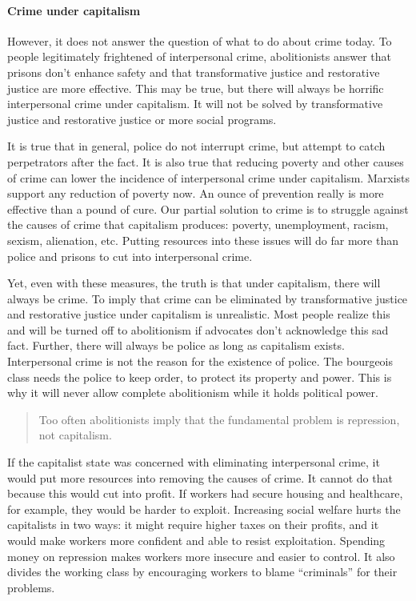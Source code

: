 \paragraph{Crime under capitalism}

However, it does not answer the question of what to do about crime today. To people legitimately frightened of interpersonal crime, abolitionists answer that prisons don't enhance safety and that transformative justice and restorative justice are more effective. This may be true, but there will always be horrific interpersonal crime under capitalism. It will not be solved by transformative justice and restorative justice or more social programs.

It is true that in general, police do not interrupt crime, but attempt to catch perpetrators after the fact. It is also true that reducing poverty and other causes of crime can lower the incidence of interpersonal crime under capitalism. Marxists support any reduction of poverty now. An ounce of prevention really is more effective than a pound of cure. Our partial solution to crime is to struggle against the causes of crime that capitalism produces: poverty, unemployment, racism, sexism, alienation, etc. Putting resources into these issues will do far more than police and prisons to cut into interpersonal crime.

Yet, even with these measures, the truth is that under capitalism, there will always be crime. To imply that crime can be eliminated by transformative justice and restorative justice under capitalism is unrealistic. Most people realize this and will be turned off to abolitionism if advocates don't acknowledge this sad fact. Further, there will always be police as long as capitalism exists. Interpersonal crime is not the reason for the existence of police. The bourgeois class needs the police to keep order, to protect its property and power. This is why it will never allow complete abolitionism while it holds political power.

\blockquote{Too often abolitionists imply that the fundamental problem is repression, not capitalism.}

If the capitalist state was concerned with eliminating interpersonal crime, it would put more resources into removing the causes of crime. It cannot do that because this would cut into profit. If workers had secure housing and healthcare, for example, they would be harder to exploit. Increasing social welfare hurts the capitalists in two ways: it might require higher taxes on their profits, and it would make workers more confident and able to resist exploitation. Spending money on repression makes workers more insecure and easier to control. It also divides the working class by encouraging workers to blame ``criminals'' for their problems.

